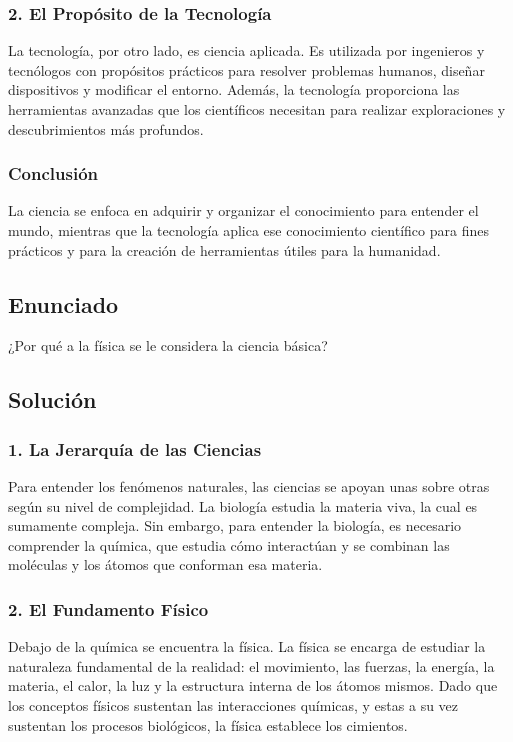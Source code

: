 \documentclass[12pt, a4paper]{article}
\begin{document}
\subsubsection*{2. El Propósito de la Tecnología}
La tecnología, por otro lado, es ciencia aplicada. Es utilizada por ingenieros y tecnólogos con propósitos prácticos para resolver problemas humanos, diseñar dispositivos y modificar el entorno. Además, la tecnología proporciona las herramientas avanzadas que los científicos necesitan para realizar exploraciones y descubrimientos más profundos.

\subsubsection*{Conclusión}
La ciencia se enfoca en adquirir y organizar el conocimiento para entender el mundo, mientras que la tecnología aplica ese conocimiento científico para fines prácticos y para la creación de herramientas útiles para la humanidad.

\newpage

\subsection*{Enunciado}
¿Por qué a la física se le considera la ciencia básica?

\subsection*{Solución}

\subsubsection*{1. La Jerarquía de las Ciencias}
Para entender los fenómenos naturales, las ciencias se apoyan unas sobre otras según su nivel de complejidad. La biología estudia la materia viva, la cual es sumamente compleja. Sin embargo, para entender la biología, es necesario comprender la química, que estudia cómo interactúan y se combinan las moléculas y los átomos que conforman esa materia.

\subsubsection*{2. El Fundamento Físico}
Debajo de la química se encuentra la física. La física se encarga de estudiar la naturaleza fundamental de la realidad: el movimiento, las fuerzas, la energía, la materia, el calor, la luz y la estructura interna de los átomos mismos. Dado que los conceptos físicos sustentan las interacciones químicas, y estas a su vez sustentan los procesos biológicos, la física establece los cimientos.
\end{document}
